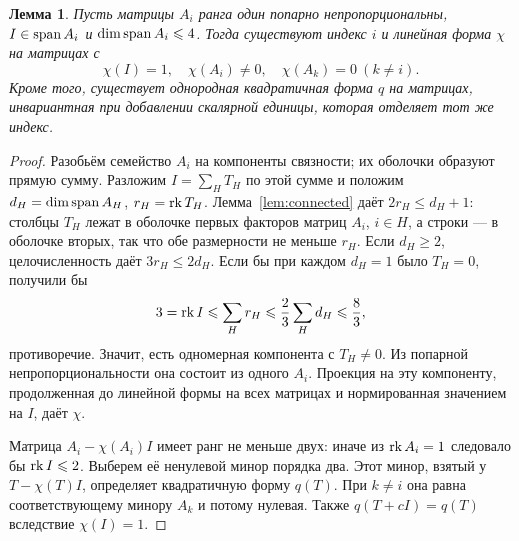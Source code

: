 \documentclass[11pt,a4paper]{article}
\numberwithin{equation}{section}
\theoremstyle{plain}
\newtheorem{lemma}[theorem]{Лемма}
\theoremstyle{definition}
\newcommand{\leqs}{\leqslant}\newcommand{\geqs}{\geqslant}
\begin{document}
\begin{lemma}\label{lem:separator}
Пусть матрицы $A_i$ ранга один попарно непропорциональны,
$I\in\operatorname{span} A_i$ и $\dim\Span A_i\leqs4$.
Тогда существуют индекс $i$ и линейная форма $\chi$ на матрицах с
\[
 \chi(I)=1,\quad\chi(A_i)\ne0,\quad\chi(A_k)=0\ (k\ne i).
\]
Кроме того, существует однородная квадратичная форма $q$ на матрицах,
инвариантная при добавлении скалярной единицы, которая отделяет тот же индекс.
\end{lemma}
\begin{proof}
Разобьём семейство $A_i$ на компоненты связности; их оболочки образуют
прямую сумму. Разложим $I=\sum_H T_H$ по этой сумме и положим
$d_H=\dim\operatorname{span} A_H$, $r_H=\operatorname{rk} T_H$.
Лемма~\ref{lem:connected} даёт $2r_H\leqs d_H+1$: столбцы $T_H$ лежат
в оболочке первых факторов матриц $A_i$, $i\in H$, а строки ---
в оболочке вторых, так что обе размерности не меньше $r_H$.
Если $d_H\geqs2$, целочисленность даёт $3r_H\leqs2d_H$.
Если бы при каждом $d_H=1$ было $T_H=0$, получили бы
\[
 3=\rk I\leqs\sum_H r_H\leqs\frac23\sum_H d_H\leqs\frac83,
\]
противоречие. Значит, есть одномерная компонента с $T_H\ne0$.
Из попарной непропорциональности она состоит из одного $A_i$.
Проекция на эту компоненту, продолженная до линейной формы на всех
матрицах и нормированная значением на $I$, даёт $\chi$.

Матрица $A_i-\chi(A_i)I$ имеет ранг не меньше двух:
иначе из $\operatorname{rk} A_i=1$ следовало бы $\rk I\leqs2$.
Выберем её ненулевой минор порядка два. Этот минор, взятый у
$T-\chi(T)I$, определяет квадратичную форму $q(T)$.
При $k\ne i$ она равна соответствующему минору $A_k$ и потому нулевая.
Также $q(T+cI)=q(T)$ вследствие $\chi(I)=1$.
\end{proof}
\end{document}
